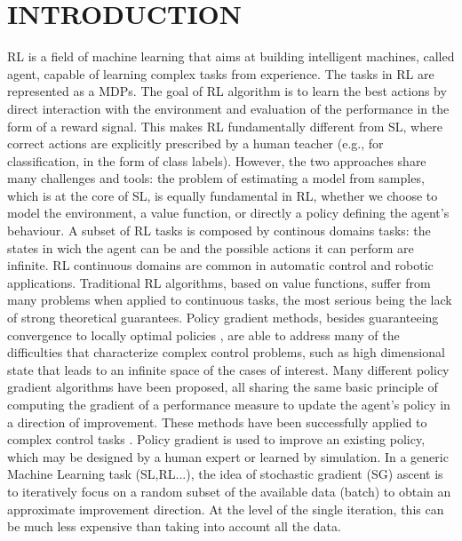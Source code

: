 
\chapter{INTRODUCTION} \label{chap:aChapter}

\ac{RL} is a field of machine learning that aims at building intelligent machines, called agent, capable of learning complex tasks from experience.
The tasks in \acs{RL} are represented as a \acs{MDP}s. 
The goal of \acs{RL} \citep{sutton1998reinforcement} algorithm is to learn the best actions by direct interaction with the environment and evaluation of the performance in the form of a reward signal.
This makes \acs{RL} fundamentally different from \ac{SL}, where correct actions are explicitly prescribed by a human teacher (e.g., for classification, in the form of class labels).
However, the two approaches share many challenges and tools: the problem of estimating a model from samples, which is at the core of \acs{SL}, is equally fundamental in \acs{RL}, whether we choose to model the environment, a value function, or directly a policy defining the agent’s behaviour.
A subset of \acs{RL} tasks is composed by continous domains tasks: the states in wich the agent can be and the possible actions it can perform are infinite.
\acs{RL} continuous domains are common in automatic control and robotic applications. Traditional \acs{RL} algorithms, based on value functions, suffer from many problems when applied to continuous tasks, the most serious being the lack of strong theoretical guarantees. Policy gradient methods, besides guaranteeing convergence to locally optimal policies \citep{sutton2000policy}, are able to address many of the difficulties that characterize complex control problems, such as high dimensional state that leads to an infinite space of the cases of interest. 
Many different policy gradient algorithms have been proposed, all sharing the same basic principle of computing the gradient of a performance measure to update the agent’s policy in a direction of improvement. These methods have been successfully applied to complex control tasks \citep{deisenroth2013survey}. Policy gradient is used to improve an existing policy, which may be designed by a human expert or learned by simulation.\newline
In a generic Machine Learning task (\acs{SL},\acs{RL}...), the idea of stochastic gradient (\acs{SG}) ascent \citep{nesterov2013introductory} is to iteratively focus on a random subset of the available data (batch) to obtain an approximate improvement direction. At the level of the single iteration, this can be much less expensive than taking into account all the data.
